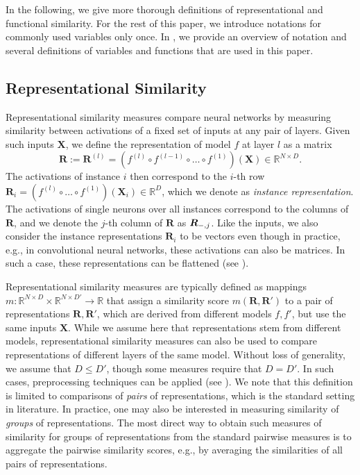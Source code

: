 \documentclass{article}
\newcommand{\Real}{\mathbb{R}}
\newcommand{\R}{\bm{R}}
\newcommand{\Rp}{\bm{R'}}
\begin{document}
In the following, we give more thorough definitions of representational and functional similarity.
For the rest of this paper, we introduce notations for commonly used variables only once.
In , we provide an overview of notation and several definitions of variables and functions that are used in this paper.



\subsection{Representational Similarity}
Representational similarity measures compare neural networks by measuring similarity between activations of a fixed set of inputs at any pair of layers. %
Given such inputs $\bm{X}$, we define the representation of model $f$ at layer $l$ as a matrix
\begin{equation}
    \R := \R^{(l)} = \left(f^{(l)} \circ f^{(l-1)} \circ \dots \circ f^{(1)}\right)(\bm{X})\in\Real^{N\times D}.
\end{equation}
The activations of instance $i$ then correspond to the $i$-th row $\R_i = \left( f^{(l)} \circ \dots \circ f^{(1)}\right) \left(\bm{X}_i\right)\in\Real^D$, which we denote as \emph{instance representation}.
The activations of single neurons over all instances correspond to the columns of $\R$, and we denote the $j$-th column of $\R$ as $\R_{\--,j}$.
Like the inputs, we also consider the instance representations $\R_i$ to be vectors even though in practice, e.g., in convolutional neural networks, these activations can also be matrices. In such a case, these representations can be flattened (see ).

Representational similarity measures are typically defined as mappings $m: \Real^{N\times D}\times \Real^{N\times D'} \longrightarrow \Real$ that assign a similarity score $m(\R,\Rp)$ to a pair of representations $\R,\Rp$, which are derived from different models $f, f'$, but use the same inputs $\bm{X}$.
While we assume here that representations stem from different models, representational similarity measures can also be used to compare representations of different layers of the same model.
Without loss of generality, we assume that $D\leq D'$, though some measures require that $D=D'$. In such cases, preprocessing techniques can be applied (see ).
We note that this definition is limited to comparisons of \emph{pairs} of representations, which is the standard setting in literature. In practice, one may also be interested in measuring similarity of \emph{groups} of representations.
The most direct way to obtain such measures of similarity for groups of representations from the standard pairwise measures is to aggregate the pairwise similarity scores, e.g., by averaging the similarities of all pairs of representations.
\end{document}
